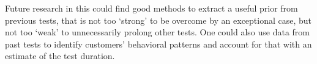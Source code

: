 \documentclass[main.tex]{subfiles}
\begin{document}
Future research in this could find good methods to extract a useful prior from previous tests, that is not too `strong' to be overcome by an exceptional case, but not too `weak' to unnecessarily prolong other tests. One could also use data from past tests to identify customers' behavioral patterns and account for that with an estimate of the test duration.

\end{document}

